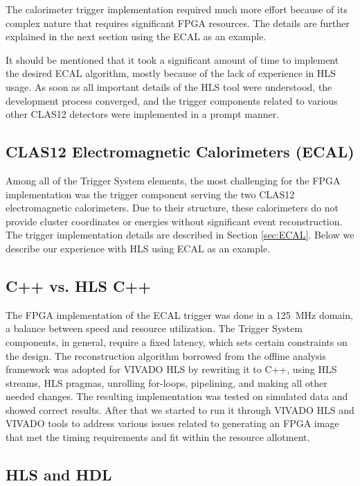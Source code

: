 The calorimeter trigger implementation required much more effort because of its complex nature that requires significant FPGA resources. The details are further explained in the next section using the ECAL as an example.

It should be mentioned that it took a significant amount of time to implement the desired ECAL algorithm, mostly because of the lack of experience in HLS usage. As soon as all important details of the HLS tool were understood, the development process converged, and the trigger components related to various other CLAS12 detectors were implemented in a prompt manner.


\subsection{CLAS12 Electromagnetic Calorimeters (ECAL)}

Among all of the Trigger System elements, the most challenging for the FPGA implementation was the trigger component serving the two CLAS12 electromagnetic calorimeters. Due to their structure, these calorimeters do not provide cluster coordinates or energies without significant event reconstruction. The trigger implementation details are described in Section \ref{sec:ECAL}. Below we describe our experience with HLS using ECAL as an example.


\subsection{C++ vs. HLS C++}

The FPGA implementation of the ECAL trigger was done in a 125~MHz domain, a balance between speed and resource utilization. The Trigger System components, in general, require a fixed latency, which sets certain constraints on the design. The reconstruction algorithm borrowed from the offline analysis framework was adopted for VIVADO HLS by rewriting it to C++, using HLS streams, HLS pragmas, unrolling for-loops, pipelining, and making all other needed changes. The resulting implementation was tested on simulated data and showed correct results. After that we started to run it through VIVADO HLS and VIVADO tools to address various issues related to generating an FPGA image that met the timing requirements and fit within the resource allotment.


\subsection{HLS and HDL}

